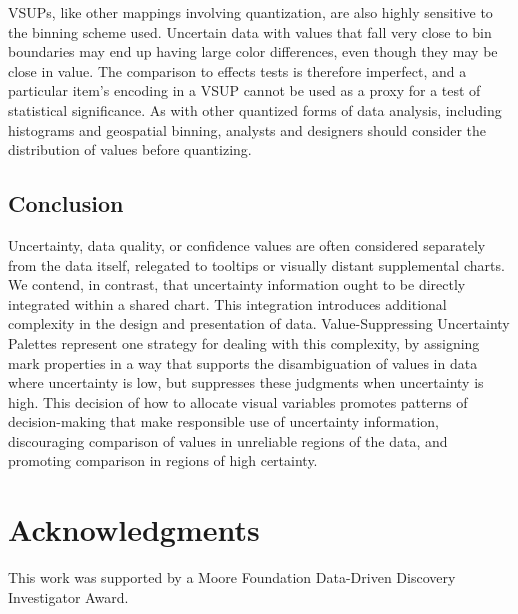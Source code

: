 VSUPs, like other mappings involving quantization, are also highly sensitive to the binning scheme used. Uncertain data with values that fall very close to bin boundaries may end up having large color differences, even though they may be close in value. The comparison to effects tests is therefore imperfect, and a particular item's encoding in a VSUP cannot be used as a proxy for a test of statistical significance. As with other quantized forms of data analysis, including histograms and geospatial binning, analysts and designers should consider the distribution of values before quantizing.

\subsection{Conclusion}

Uncertainty, data quality, or confidence values are often considered separately from the data itself, relegated to tooltips or visually distant supplemental charts. We contend, in contrast, that uncertainty information ought to be directly integrated within a shared chart. This integration introduces additional complexity in the design and presentation of data. Value-Suppressing Uncertainty Palettes represent one strategy for dealing with this complexity, by assigning mark properties in a way that supports the disambiguation of values in data where uncertainty is low, but suppresses these judgments when uncertainty is high. This decision of how to allocate visual variables promotes patterns of decision-making that make responsible use of uncertainty information, discouraging comparison of values in unreliable regions of the data, and promoting comparison in regions of high certainty.

\section{Acknowledgments}

This work was supported by a Moore Foundation Data-Driven Discovery Investigator Award.
